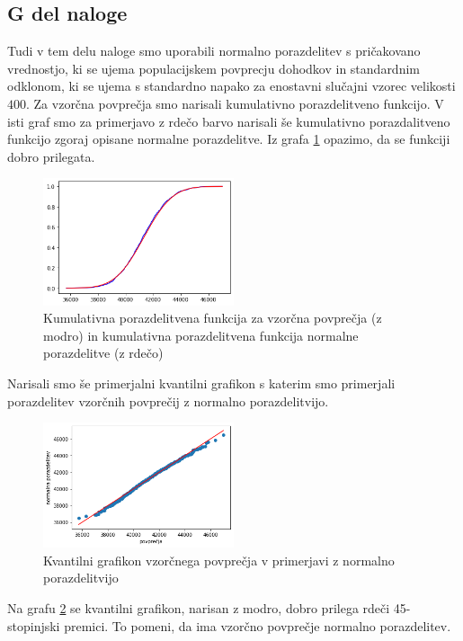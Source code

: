\documentclass{article}
\begin{document}
\subsection{G del naloge}
Tudi v tem delu naloge smo uporabili normalno porazdelitev s pričakovano vrednostjo,
ki se ujema populacijskem povprecju dohodkov in standardnim odklonom, ki se ujema s standardno napako za 
enostavni slučajni vzorec velikosti $400$.
Za vzorčna povprečja smo narisali kumulativno porazdelitveno funkcijo. V isti graf smo za primerjavo z 
rdečo barvo narisali še kumulativno porazdalitveno funkcijo zgoraj opisane normalne porazdelitve.
Iz grafa \ref*{CDFpovprecja} opazimo, da se funkciji dobro prilegata.
\begin{figure}[H]
    \begin{center}
        \includegraphics*[width=0.5\textwidth]{figure1G.png}
        \caption{Kumulativna porazdelitvena funkcija za vzorčna povprečja (z modro) in kumulativna porazdelitvena funkcija normalne porazdelitve (z rdečo)}
        \label{CDFpovprecja}
    \end{center}
\end{figure}

Narisali smo še primerjalni kvantilni grafikon s katerim smo primerjali porazdelitev vzorčnih povprečij z
normalno porazdelitvijo.
\begin{figure}[H]
    \begin{center}
        \includegraphics*[width=0.5\textwidth]{figure1G(1).png}
        \caption{Kvantilni grafikon vzorčnega povprečja v primerjavi z normalno porazdelitvijo }
        \label{QQvzor}
    \end{center}
\end{figure}
Na grafu \ref*{QQvzor} se kvantilni grafikon, narisan z modro, dobro prilega rdeči 45-stopinjski premici.
To pomeni, da ima vzorčno povprečje normalno porazdelitev.
\end{document}
